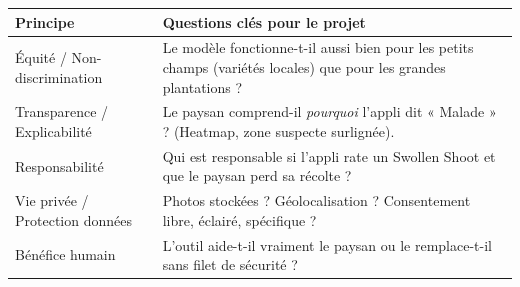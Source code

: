 \documentclass[11pt]{article}
\newcommand{\cle}[1]{{\popxbold\color{popdark}#1}}
\begin{document}
\begin{propriete}
\begin{center}
\begin{tabularx}{\linewidth}{|l|X|}\hline
\textbf{Principe} & \textbf{Questions clés pour le projet} \\\hline
\cle{Équité} / Non-discrimination & Le modèle fonctionne-t-il aussi bien pour les petits champs (variétés locales) que pour les grandes plantations ? \\\hline
\cle{Transparence} / Explicabilité & Le paysan comprend-il \emph{pourquoi} l'appli dit « Malade » ? (Heatmap, zone suspecte surlignée). \\\hline
\cle{Responsabilité} & Qui est responsable si l'appli rate un Swollen Shoot et que le paysan perd sa récolte ? \\\hline
Vie privée / Protection données & Photos stockées ? Géolocalisation ? Consentement libre, éclairé, spécifique ? \\\hline
Bénéfice humain & L'outil aide-t-il vraiment le paysan ou le remplace-t-il sans filet de sécurité ? \\\hline
\end{tabularx}
\end{center}
\end{propriete}
\end{document}
